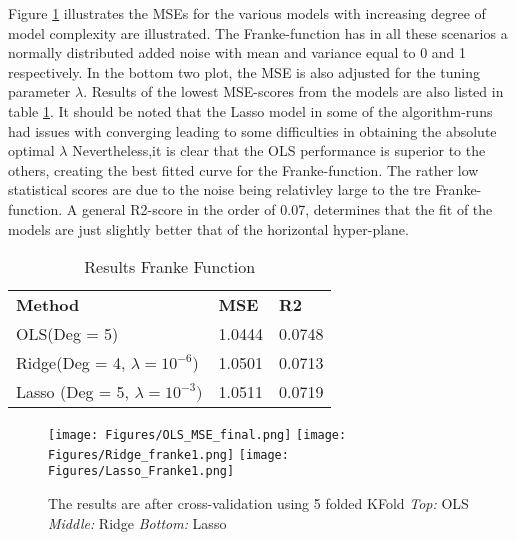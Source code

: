 \documentclass[...,numrefs]{wiley-article}
\begin{document}
Figure \ref{OLs_Lasso_Ridge} illustrates the MSEs for the various models with increasing degree of model complexity are illustrated. The Franke-function has in all these scenarios a normally distributed added noise with mean and variance equal to 0 and 1 respectively. In the bottom two plot, the MSE is also adjusted for the tuning parameter $\lambda$. Results of the lowest MSE-scores from the models are also listed in table \ref{table_MSE}. It should be noted that the Lasso model in some of the algorithm-runs had issues with converging leading to some difficulties in obtaining the absolute optimal $\lambda$ Nevertheless,it is clear that the OLS performance is superior to the others, creating the best fitted curve for the Franke-function. The rather low statistical scores are due to the noise being relativley large to the tre Franke-function. A general R2-score in the order of 0.07, determines that the fit of the models are just slightly better that of the horizontal hyper-plane. 



\begin{table}[h]
\centering
\caption{Results Franke Function}
\begin{tabular}{lll}
\textbf{Method} & \textbf{MSE} & \textbf{R2}  \\
 OLS(Deg = 5) & 1.0444 & 0.0748 \\
 Ridge(Deg = 4, $\lambda = 10^{-6}$) &  1.0501   &  0.0713  \\
 Lasso (Deg = 5, $\lambda = 10^{-3})$ & 1.0511  &  0.0719 
 \label{table_MSE}
\end{tabular}
\end{table}


\begin{figure}[h]
    \centering
    \texttt{[image: Figures/OLS\_MSE\_final.png]}
    \texttt{[image: Figures/Ridge\_franke1.png]}
    \texttt{[image: Figures/Lasso\_Franke1.png]}
    \caption[MSE for increasing model complexity of OLS.] {The results are after cross-validation using 5 folded KFold
    \textit{Top:} OLS \textit{Middle:} Ridge \textit{Bottom:} Lasso}
   \label{OLs_Lasso_Ridge}
\end{figure}

\clearpage
\noident
\end{document}
